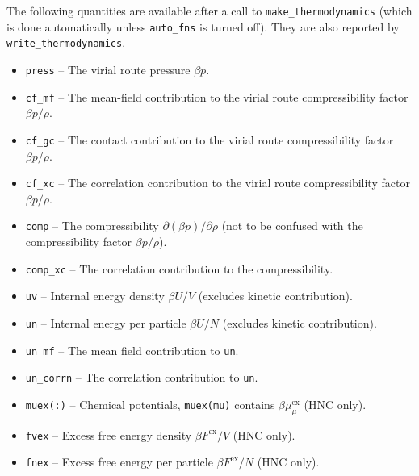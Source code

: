 \documentclass[12pt,a4paper]{article}
\newcommand{\myex}{^{\mathrm{ex}}}
\newcommand{\Fex}{F\myex}
\newcommand{\muex}{\mu\myex}
\begin{document}
%
The following quantities are available after a call to
\verb+make_thermodynamics+ (which is done automatically unless
\verb+auto_fns+ is turned off).  They are also reported by
\verb+write_thermodynamics+.
%
\begin{itemize}
%
\item\verb+press+ -- The virial route pressure $\beta p$.
%
\item\verb+cf_mf+ -- The mean-field contribution to the
virial route compressibility factor $\beta p/\rho$.
%
\item\verb+cf_gc+ -- The contact contribution to the
virial route compressibility factor $\beta p/\rho$.
%
\item\verb+cf_xc+ -- The correlation contribution to the
 virial route compressibility factor $\beta p/\rho$.
%
\item\verb+comp+ -- The compressibility $\partial(\beta
  p)/\partial\rho$ (not to be confused with the 
  compressibility factor $\beta p/\rho$).
%
\item\verb+comp_xc+ -- The correlation contribution to the
  compressibility.
%
\item\verb+uv+ -- Internal energy density $\beta U/V$ (excludes
  kinetic contribution).
%
\item\verb+un+ -- Internal energy per particle $\beta U/N$ (excludes
  kinetic contribution).
%
\item\verb+un_mf+ -- The mean field contribution to \verb+un+.
%
\item\verb+un_corrn+ -- The correlation contribution to \verb+un+.
%
\item\verb+muex(:)+ -- Chemical potentials, \verb+muex(mu)+ contains
  $\beta\muex_\mu$ (HNC only).
%
\item\verb+fvex+ -- Excess free energy density $\beta \Fex/V$ (HNC only).
%
\item\verb+fnex+ -- Excess free energy per particle $\beta \Fex/N$ (HNC only).
%
\end{itemize}
\end{document}
